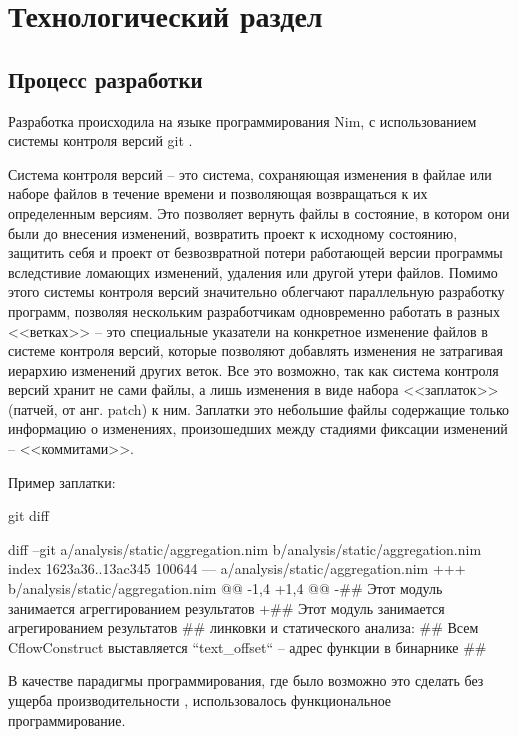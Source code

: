 \chapter{Технологический раздел}\label{ch:ch3}
\section{Процесс разработки {\ProgModule}}\label{sec:ch3/sec1}
Разработка {\ProgModule} происходила на языке программирования Nim,
с использованием системы контроля версий git \autocite{git}.

Система контроля версий -- это система, сохраняющая
изменения в файлае или наборе файлов в течение времени и позволяющая возвращаться к их
определенным версиям. 
Это позволяет вернуть файлы в состояние, в котором они были до внесения изменений,
возвратить проект к исходному состоянию, защитить себя и проект от безвозвратной потери
работающей версии программы вследстивие ломающих изменений, удаления или другой утери файлов.
Помимо этого системы контроля версий значительно облегчают параллельную разработку программ,
позволяя нескольким разработчикам одновременно работать в разных <<ветках>> -- 
это специальные указатели на конкретное изменение файлов в системе контроля версий,
которые позволяют добавлять изменения не затрагивая иерархию изменений других веток.
Все это возможно, так как система контроля версий хранит не сами файлы, а лишь
изменения в виде набора <<заплаток>> (патчей, от анг. patch) к ним. Заплатки это небольшие файлы
содержащие только информацию о изменениях, произошедших между стадиями фиксации изменений -- 
<<коммитами>>.

Пример заплатки:
\hspace{-3ex}
\begin{ListingEnv}[!h]
    \captiondelim{ }
    \caption{git diff}\label{lst:diff}
    \small
    \begin{Verb}[]
    diff --git a/analysis/static/aggregation.nim b/analysis/static/aggregation.nim
    index 1623a36..13ac345 100644
    --- a/analysis/static/aggregation.nim
    +++ b/analysis/static/aggregation.nim
    @@ -1,4 +1,4 @@
    -## Этот модуль занимается агреггированием результатов
    +## Этот модуль занимается агрегированием результатов
     ## линковки и статического анализа:
     ## Всем CflowConstruct выставляется ``text_offset`` -- адрес функции в бинарнике
     ##
    \end{Verb}
\end{ListingEnv}

В качестве парадигмы программирования, где было возможно это сделать без
ущерба производительности {\ProgModule}, использовалось функциональное
программирование.

